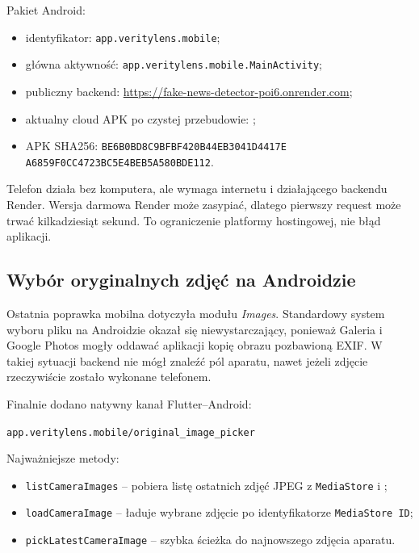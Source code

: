 \documentclass[12pt,a4paper]{article}
\begin{document}
Pakiet Android:
\begin{itemize}
  \item identyfikator: \texttt{app.veritylens.mobile};
  \item główna aktywność: \texttt{app.veritylens.mobile.MainActivity};
  \item publiczny backend: \url{https://fake-news-detector-poi6.onrender.com};
  \item aktualny cloud APK po czystej przebudowie: ;
  \item APK SHA256: \texttt{BE6B0BD8C9BFBF420B44EB3041D4417E}\\
  \texttt{A6859F0CC4723BC5E4BEB5A580BDE112}.
\end{itemize}

Telefon działa bez komputera, ale wymaga internetu i działającego backendu Render.
Wersja darmowa Render może zasypiać, dlatego pierwszy request może trwać kilkadziesiąt sekund.
To ograniczenie platformy hostingowej, nie błąd aplikacji.

\subsection{Wybór oryginalnych zdjęć na Androidzie}
Ostatnia poprawka mobilna dotyczyła modułu \textit{Images}.
Standardowy system wyboru pliku na Androidzie okazał się niewystarczający, ponieważ Galeria i Google Photos mogły oddawać aplikacji kopię obrazu pozbawioną EXIF.
W takiej sytuacji backend nie mógł znaleźć pól aparatu, nawet jeżeli zdjęcie rzeczywiście zostało wykonane telefonem.

Finalnie dodano natywny kanał Flutter--Android:
\begin{center}
\texttt{app.veritylens.mobile/original\_image\_picker}
\end{center}

Najważniejsze metody:
\begin{itemize}
  \item \texttt{listCameraImages} -- pobiera listę ostatnich zdjęć JPEG z \texttt{MediaStore} i ;
  \item \texttt{loadCameraImage} -- ładuje wybrane zdjęcie po identyfikatorze \texttt{MediaStore ID};
  \item \texttt{pickLatestCameraImage} -- szybka ścieżka do najnowszego zdjęcia aparatu.
\end{itemize}
\end{document}
